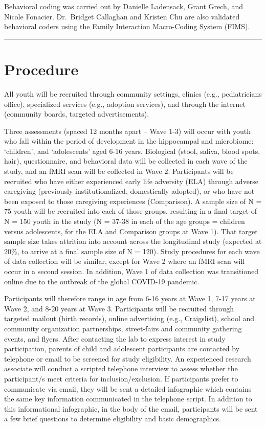 \documentclass[]{book}
\begin{document}
Behavioral coding was carried out by Danielle Ladensack, Grant Grech, and Nicole Fonacier. Dr.~Bridget Callaghan and Kristen Chu are also validated behavioral coders using the Family Interaction Macro-Coding System (FIMS).

\begin{center}\rule{0.5\linewidth}{0.5pt}\end{center}

\hypertarget{procedure}{%
\section{Procedure}\label{procedure}}

All youth will be recruited through community settings, clinics (e.g., pediatricians office), specialized services (e.g., adoption services), and through the internet (community boards, targeted advertisements).

Three assessments (spaced 12 months apart -- Wave 1-3) will occur with youth who fall within the period of development in the hippocampal and microbiome: `children', and `adolescents' aged 6-16 years. Biological (stool, saliva, blood spots, hair), questionnaire, and behavioral data will be collected in each wave of the study, and an fMRI scan will be collected in Wave 2. Participants will be recruited who have either experienced early life adversity (ELA) through adverse caregiving (previously institutionalized, domestically adopted), or who have not been exposed to those caregiving experiences (Comparison). A sample size of N = 75 youth will be recruited into each of those groups, resulting in a final target of N = 150 youth in the study (N = 37-38 in each of the age groups = children versus adolescents, for the ELA and Comparison groups at Wave 1). That target sample size takes attrition into account across the longitudinal study (expected at 20\%, to arrive at a final sample size of N = 120). Study procedures for each wave of data collection will be similar, except for Wave 2 where an fMRI scan will occur in a second session. In addition, Wave 1 of data collection was transitioned online due to the outbreak of the global COVID-19 pandemic.

Participants will therefore range in age from 6-16 years at Wave 1, 7-17 years at Wave 2, and 8-20 years at Wave 3. Participants will be recruited through targeted mailout (birth records), online advertising (e.g., Craigslist), school and community organization partnerships, street-fairs and community gathering events, and flyers. After contacting the lab to express interest in study participation, parents of child and adolescent participants are contacted by telephone or email to be screened for study eligibility. An experienced research associate will conduct a scripted telephone interview to assess whether the participant/s meet criteria for inclusion/exclusion. If participants prefer to communicate via email, they will be sent a detailed infographic which contains the same key information communicated in the telephone script. In addition to this informational infographic, in the body of the email, participants will be sent a few brief questions to determine eligibility and basic demographics.
\end{document}
